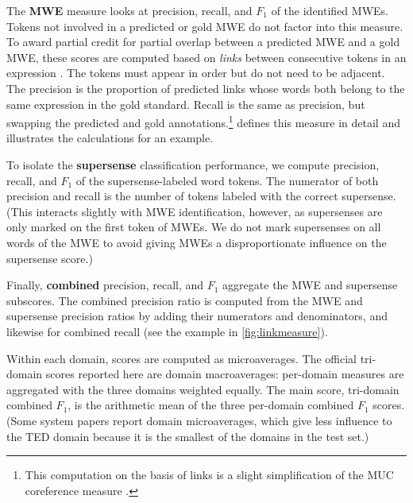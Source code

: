 \documentclass[11pt,letterpaper]{article}
\newcommand{\dataset}[1]{\mbox{\textsc{#1}}}	%
\newcommand{\longversion}[1]{#1} %
\begin{document}
The \textbf{MWE} measure looks at precision, recall, and $F_1$ 
of the identified MWEs. Tokens not involved in a predicted or gold MWE
do not factor into this measure. 
To award partial credit for partial overlap between a predicted MWE 
and a gold MWE, these scores are computed based on \emph{links} between consecutive tokens in an expression \citep{schneider-14}. 
The tokens must appear in order but do not need to be adjacent.
The precision is the proportion of predicted links whose words 
both belong to the same expression in the gold standard. 
Recall is the same as precision, but swapping the predicted and gold annotations.\longversion{\footnote{This computation on the basis of links 
is a slight simplification of the MUC coreference measure \citep{vilain-95}.}}
 defines this measure in detail and illustrates the calculations for an example.


To isolate the \textbf{supersense} classification performance, 
we compute precision, recall, and $F_1$ of the supersense-labeled word tokens.
The numerator of both precision and recall is the number of tokens 
labeled with the correct supersense.
(This interacts slightly with MWE identification, however, 
as supersenses are only marked on the first token of MWEs. 
We do not mark supersenses on all words of the MWE to avoid 
giving MWEs a disproportionate influence on the supersense score.)

Finally, \textbf{combined} precision, recall, and $F_1$ 
aggregate the MWE and supersense subscores.
The combined precision ratio is computed from the MWE and supersense precision ratios 
by adding their numerators and denominators, and likewise for combined recall 
(see the example in \cref{fig:linkmeasure}).

Within each domain, scores are computed as microaverages.
The official tri-domain scores reported here are domain macroaverages:  
per-domain measures are aggregated with the three domains weighted equally. 
The main score, tri-domain combined $F_1$, is the arithmetic mean of the three per-domain combined $F_1$ scores.
(Some system papers report domain microaverages, which give less influence to the \dataset{TED} domain 
because it is the smallest of the domains in the test set.)
\end{document}

